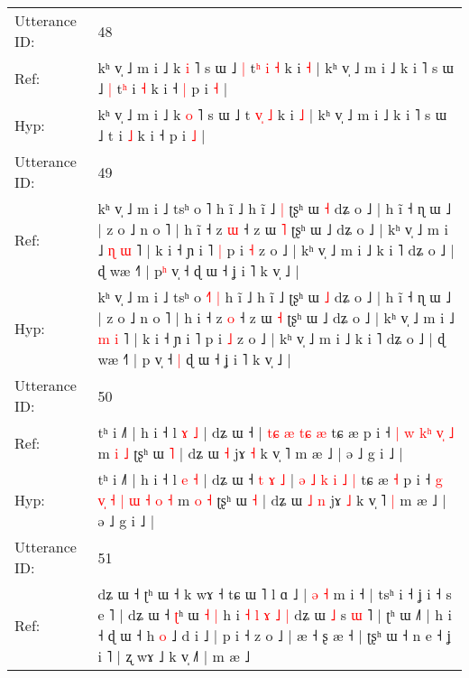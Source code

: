 \documentclass[10pt]{article}
\DeclareRobustCommand{\hl}[1]{{\textcolor{red}{#1}}}
\begin{document}
\begin{longtable}{ll}
 \\
\midrule
Utterance ID: & 48 \\
Ref: & kʰ v̩ ˩ m i ˩ k \hl{i} ˥ s ɯ ˩\hl{ }\hl{|} t\hl{ʰ}\hl{ }\hl{i} \hl{˧} k i \hl{˧} | kʰ v̩ ˩ m i ˩ k i ˥ s ɯ ˩\hl{ }\hl{|} t\hl{ʰ} i \hl{˧} k i ˧\hl{ }\hl{|} p i \hl{˧} |
 \\
Hyp: & kʰ v̩ ˩ m i ˩ k \hl{o} ˥ s ɯ ˩\hl{}\hl{} t\hl{ }\hl{v}\hl{̩} \hl{˩} k i \hl{˩} | kʰ v̩ ˩ m i ˩ k i ˥ s ɯ ˩\hl{}\hl{} t\hl{} i \hl{˩} k i ˧\hl{}\hl{} p i \hl{˩} |
 \\
\midrule
Utterance ID: & 49 \\
Ref: & kʰ v̩ ˩ m i ˩ tsʰ o \hl{}˥\hl{}\hl{} h ĩ ˩ h ĩ ˩\hl{ }\hl{|} ʈʂʰ ɯ \hl{˧} dʑ o ˩ | h ĩ ˧ ɳ ɯ ˩ | z o ˩ n o ˥ | h i\hl{̃} ˧ z \hl{ɯ} ˧ z ɯ \hl{˥} ʈʂʰ ɯ ˩ dʑ o ˩ | kʰ v̩ ˩ m i ˩ \hl{ɳ} \hl{ɯ} ˥ | k i ˧ ɲ i ˥\hl{ }\hl{|} p i \hl{˧} z o ˩ | kʰ v̩ ˩ m i ˩ k i ˥ dʑ o ˩ | ɖ wæ ˧˥ | p\hl{ʰ} v̩ ˧\hl{}\hl{} ɖ ɯ ˧ ʝ i ˥ k v̩ ˩ |
 \\
Hyp: & kʰ v̩ ˩ m i ˩ tsʰ o \hl{˧}˥\hl{ }\hl{|} h ĩ ˩ h ĩ ˩\hl{}\hl{} ʈʂʰ ɯ \hl{˩} dʑ o ˩ | h ĩ ˧ ɳ ɯ ˩ | z o ˩ n o ˥ | h i\hl{} ˧ z \hl{o} ˧ z ɯ \hl{˧} ʈʂʰ ɯ ˩ dʑ o ˩ | kʰ v̩ ˩ m i ˩ \hl{m} \hl{i} ˥ | k i ˧ ɲ i ˥\hl{}\hl{} p i \hl{˩} z o ˩ | kʰ v̩ ˩ m i ˩ k i ˥ dʑ o ˩ | ɖ wæ ˧˥ | p\hl{} v̩ ˧\hl{ }\hl{|} ɖ ɯ ˧ ʝ i ˥ k v̩ ˩ |
 \\
\midrule
Utterance ID: & 50 \\
Ref: & tʰ i ˩˥ | h i ˧ l \hl{ɤ} \hl{˩} | dʑ ɯ ˧\hl{}\hl{}\hl{}\hl{}\hl{}\hl{} | \hl{}\hl{t}\hl{ɕ} \hl{æ} \hl{}\hl{t}\hl{ɕ} \hl{æ} tɕ æ\hl{}\hl{} p i ˧\hl{}\hl{} \hl{}\hl{|} \hl{w} \hl{}\hl{k}\hl{ʰ} \hl{}\hl{v}\hl{̩} \hl{˩} m \hl{i} \hl{˩} ʈʂʰ ɯ \hl{˥} | dʑ ɯ\hl{}\hl{} \hl{˧} jɤ \hl{˧} k v̩ ˥\hl{}\hl{} m æ ˩ | ə ˩ g i ˩ |
 \\
Hyp: & tʰ i ˩˥ | h i ˧ l \hl{e} \hl{˧} | dʑ ɯ ˧\hl{ }\hl{t}\hl{ }\hl{ɤ}\hl{ }\hl{˩} | \hl{ə}\hl{ }\hl{˩} \hl{k} \hl{i}\hl{ }\hl{˩} \hl{|} tɕ æ\hl{ }\hl{˧} p i ˧\hl{ }\hl{g} \hl{v}\hl{̩} \hl{˧} \hl{|}\hl{ }\hl{ɯ} \hl{˧}\hl{ }\hl{o} \hl{˧} m \hl{o} \hl{˧} ʈʂʰ ɯ \hl{˧} | dʑ ɯ\hl{ }\hl{˩} \hl{n} jɤ \hl{˩} k v̩ ˥\hl{ }\hl{|} m æ ˩ | ə ˩ g i ˩ |
 \\
\midrule
Utterance ID: & 51 \\
Ref: & dʑ ɯ ˧ ʈʰ ɯ ˧ k wɤ ˧ tɕ ɯ ˥ l ɑ ˩ |\hl{}\hl{}\hl{}\hl{}\hl{}\hl{}\hl{}\hl{} \hl{ə} \hl{˧} m i ˧ | tsʰ i ˧ ʝ i ˧ s e ˥ | dʑ ɯ ˧ \hl{ʈ}ʰ ɯ\hl{ }\hl{˧} \hl{|} h i \hl{˧} \hl{l} \hl{ɤ} \hl{˩} \hl{|} dʑ ɯ \hl{˩} s \hl{}\hl{ɯ} ˥ | ʈʰ ɯ ˩\hl{˥} | h i ˧ ɖ ɯ ˧ h \hl{}\hl{o} ˩ d i ˩ | p i ˧ z o ˩ | æ ˧ ʂ æ ˧ | ʈʂʰ ɯ ˧ n e ˧ ʝ i ˥ | ʐ wɤ ˩ k v̩ ˩˥ | m æ ˩

\end{longtable}
\end{document}
